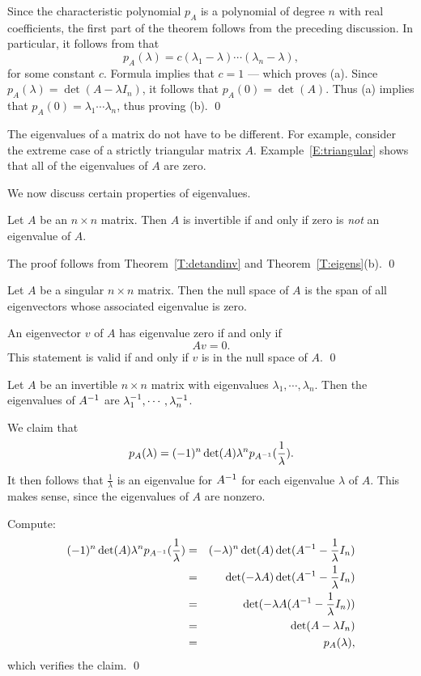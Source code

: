 \proof Since the characteristic polynomial $p_A$ is a polynomial
of degree $n$ with real coefficients, the first part of the
theorem follows from the preceding discussion. In particular, it follows
from  that 
\[
p_A(\lambda) = c(\lambda_1-\lambda)\cdots(\lambda_n-\lambda),
\]
for some constant $c$.  Formula  implies that
$c=1$ --- which proves (a).  Since $p_A(\lambda)=\det(A-\lambda I_n)$, 
it follows that $p_A(0)=\det(A)$.  Thus (a) implies 
that $p_A(0)=\lambda_1\cdots\lambda_n$, thus proving (b).  \qed

The eigenvalues of a matrix do not have to be different.  For
example, consider the extreme case of a strictly triangular
matrix $A$.  Example~\ref{E:triangular} shows that all of the
eigenvalues of $A$ are zero. 

We now discuss certain properties of eigenvalues.  
\begin{cor}  \label{C:eig=0}
Let $A$ be an $n\times n$ matrix. Then $A$ is invertible if and
only if zero is {\em not\/} an eigenvalue of $A$.
\end{cor}  

\proof The proof follows from Theorem~\ref{T:detandinv} and
Theorem~\ref{T:eigens}(b). \qed 

\begin{lemma} 
Let $A$ be a singular $n\times n$ matrix.  Then the null space of $A$
is the span of all eigenvectors whose associated eigenvalue is zero.
\end{lemma} 

\proof An eigenvector $v$ of $A$ has eigenvalue zero if and only
if 
\[
Av=0.
\]
This statement is valid if and only if $v$ is in the null space
of $A$. \qed



\begin{thm}  \label{T:inveig}
Let $A$ be an invertible $n\times n$ matrix with eigenvalues 
$\lambda_1,\cdots,\lambda_n$.  Then the eigenvalues of 
$A^{-1}$ are $\lambda_1^{-1},\cdots,\lambda_n^{-1}$.
\end{thm}  

\proof  We claim that  
\[
p_A(\lambda) = (-1)^n \det(A) \lambda^n p_{A^{-1}}(\frac{1}{\lambda}).
\]
It then follows that $\frac{1}{\lambda}$ is an eigenvalue for
$A^{-1}$ for each eigenvalue $\lambda$ of $A$.  This makes sense,
since the eigenvalues of $A$ are nonzero. 

Compute:
\begin{eqnarray*}
(-1)^n \det(A) \lambda^n p_{A^{-1}}(\frac{1}{\lambda}) & = &
 (-\lambda)^n \det(A)\det(A^{-1}-\frac{1}{\lambda}I_n) \\
& = & \det(-\lambda A)\det(A^{-1}-\frac{1}{\lambda}I_n)\\
& = & \det(-\lambda A (A^{-1}-\frac{1}{\lambda}I_n))\\
& = & \det(A-\lambda I_n) \\
& = & p_A(\lambda),
\end{eqnarray*}
which verifies the claim.  \qed

